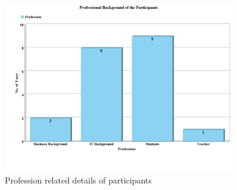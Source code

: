 \begin{figure}[!h]
    \centering
    \includegraphics[width=0.9\textwidth]{img/Profession_Graph_Updated_2.PNG}
    \caption{Profession related details of participants}
    \label{fig:profGraph}
\end{figure}

